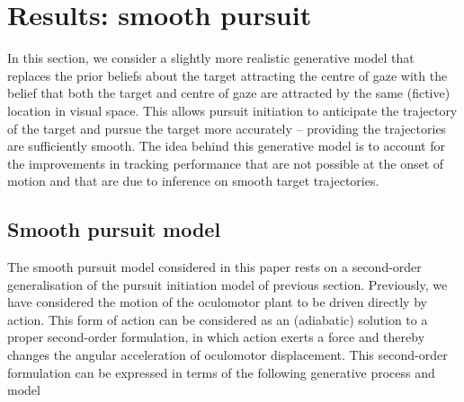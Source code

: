 \documentclass[a4paper]{article} %
\begin{document}
\section{Results: smooth pursuit}
\label{sec:spem}
In this section, we consider a slightly more realistic generative model
that replaces the prior beliefs about the target attracting the centre
of gaze with the belief that both the target and centre of gaze are
attracted by the same (fictive) location in visual space. This allows
pursuit initiation to anticipate the trajectory of the target and pursue
the target more accurately -- providing the trajectories are
sufficiently smooth. The idea behind this generative model is to account
for the improvements in tracking performance that are not possible at
the onset of motion and that are due to inference on smooth target
trajectories.

\subsection{Smooth pursuit model}

The smooth pursuit model considered in this paper rests on a
second-order generalisation of the pursuit initiation model of previous
section. Previously, we have considered the motion of the oculomotor
plant to be driven directly by action. This form of action can be
considered as an (adiabatic) solution to a proper second-order
formulation, in which action exerts a force and thereby changes the
angular acceleration of oculomotor displacement. This second-order
formulation can be expressed in terms of the following generative
process and model
\end{document}
